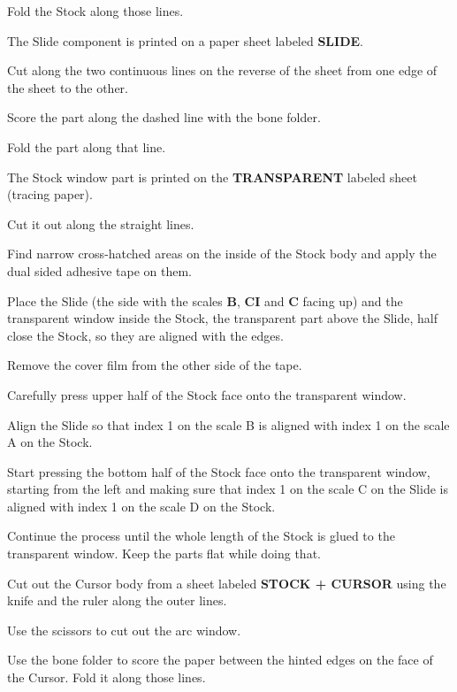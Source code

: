 \begin{multicols*}{3}
{Fold the Stock along those lines.


\footnotesize The Slide component is printed on a paper sheet labeled \textbf{SLIDE}.\normalsize

 Cut along the two continuous lines on the reverse of the sheet from one edge of the sheet to the other.

 Score the part along the dashed line with the bone folder.

 Fold the part along that line. 


\footnotesize The Stock window part is printed on the \textbf{TRANSPARENT} labeled sheet (tracing paper). \normalsize

 Cut it out along the straight lines.


Find narrow cross-hatched areas on the inside of the Stock body and apply the dual sided adhesive tape on them.

Place the Slide (the side with the scales \textbf{B}, \textbf{CI} and \textbf{C} facing up) and the transparent window inside the Stock, the transparent part above the Slide, half close the Stock, so they are aligned with the edges.

Remove the cover film from the other side of the tape.

Carefully press upper half of the Stock face onto the transparent window.

Align the Slide so that index 1 on the scale B is aligned with index 1 on the scale A on the Stock.

Start pressing the bottom half of the Stock face onto the transparent window, starting from the left and making sure that index 1 on the scale C on the Slide is aligned with index 1 on the scale D on the Stock.

Continue the process until the whole length of the Stock is glued to the transparent window. Keep the parts flat while doing that.
 

Cut out the Cursor body from a sheet labeled \textbf{STOCK + CURSOR} using the knife and the ruler along the outer lines.

Use the scissors to cut out the arc window.

Use the bone folder to score the paper between the hinted edges on the face of the Cursor. Fold it along those lines.

}
\end{multicols*}
